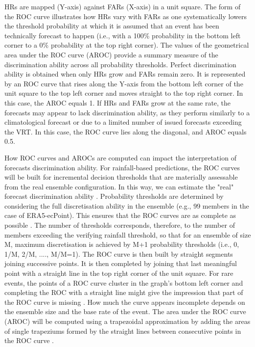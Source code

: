 HRs are mapped (Y-axis) against FARs (X-axis) in a unit square. The form of the ROC curve illustrates how HRs vary with FARs as one systematically lowers the threshold probability at which it is assumed that an event has been technically forecast to happen (i.e., with a 100\% probability in the bottom left corner to a 0\% probability at the top right corner). The values of the geometrical area under the ROC curve (AROC) provide a summary measure of the discrimination ability across all probability thresholds. Perfect discrimination ability is obtained when only HRs grow and FARs remain zero. It is represented by an ROC curve that rises along the Y-axis from the bottom left corner of the unit square to the top left corner and moves straight to the top right corner. In this case, the AROC equals 1. If HRs and FARs grow at the same rate, the forecasts may appear to lack discrimination ability, as they perform similarly to a climatological forecast or due to a limited number of issued forecasts exceeding the VRT. In this case, the ROC curve lies along the diagonal, and AROC equals 0.5. 

How ROC curves and AROCs are computed can impact the interpretation of forecasts discrimination ability. For rainfall-based predictions, the ROC curves will be built for incremental decision thresholds that are materially assessable from the real ensemble configuration. In this way, we can estimate the "real" forecast discrimination ability \citep{Wilks_2020}. Probability thresholds are determined by considering the full discretisation ability in the ensemble (e.g., 99 members in the case of ERA5-ecPoint). This ensures that the ROC curves are as complete as possible \citep{Bouallegue_2022}. The number of thresholds corresponds, therefore, to the number of members exceeding the verifying rainfall threshold, so that for an ensemble of size M, maximum discretisation is achieved by M+1 probability thresholds (i.e., 0, 1/M, 2/M, ...., M/M=1). The ROC curve is then built by straight segments joining successive points. It is then completed by joining that last meaningful point with a straight line in the top right corner of the unit square. For rare events, the points of a ROC curve cluster in the graph's bottom left corner and completing the ROC with a straight line might give the impression that part of the ROC curve is missing \citep{Casati_2008}. How much the curve appears incomplete depends on the ensemble size and the base rate of the event. The area under the ROC curve (AROC) will be computed using a trapezoidal approximation by adding the areas of single trapeziums formed by the straight lines between consecutive points in the ROC curve \citep{Bouallegue_2022}. 

